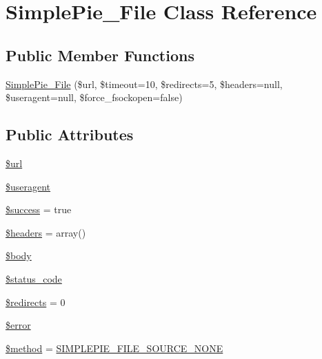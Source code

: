 \hypertarget{class_simple_pie___file}{\section{Simple\-Pie\-\_\-\-File Class Reference}
\label{class_simple_pie___file}
}
\subsection*{Public Member Functions}
\begin{DoxyCompactItemize}
\item 
\hyperlink{class_simple_pie___file_aafc47d92db47c6aa11a2c64f3e065b1b}{Simple\-Pie\-\_\-\-File} (\$url, \$timeout=10, \$redirects=5, \$headers=null, \$useragent=null, \$force\-\_\-fsockopen=false)
\end{DoxyCompactItemize}
\subsection*{Public Attributes}
\begin{DoxyCompactItemize}
\item 
\hyperlink{class_simple_pie___file_ac6ece4ef8c713f42fb22b105d52153c6}{\$url}
\item 
\hyperlink{class_simple_pie___file_a6b4c8902288045d12d5a3ee9603832a6}{\$useragent}
\item 
\hyperlink{class_simple_pie___file_af05c48ad88b4a050c310b32527284f52}{\$success} = true
\item 
\hyperlink{class_simple_pie___file_ae8482dff7d8265e5e253bdf1af583416}{\$headers} = array()
\item 
\hyperlink{class_simple_pie___file_a2821f719c5d29f8fe8c64b81fe7d5823}{\$body}
\item 
\hyperlink{class_simple_pie___file_a143626f83244c8e9957cf316beff8f9d}{\$status\-\_\-code}
\item 
\hyperlink{class_simple_pie___file_adf94fc2991896766e43705995cbcf5f3}{\$redirects} = 0
\item 
\hyperlink{class_simple_pie___file_ae1bd37c54bc14e3bafc6ae94739e204c}{\$error}
\item 
\hyperlink{class_simple_pie___file_a9190c10db62f456aeb5304a4f47b40ab}{\$method} = \hyperlink{simplepie_8inc_a29c651a605663acf38e6f86829604865}{S\-I\-M\-P\-L\-E\-P\-I\-E\-\_\-\-F\-I\-L\-E\-\_\-\-S\-O\-U\-R\-C\-E\-\_\-\-N\-O\-N\-E}
\end{DoxyCompactItemize}


